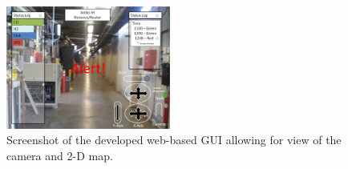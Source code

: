 \begin{figure}
	\centering
	\includegraphics[width=0.48\textwidth]{pictures/gui-slac.png}
	\caption{Screenshot of the developed web-based GUI allowing for view of the camera and 2-D map.}
	\label{fig:gui_screenshot}
\end{figure}
